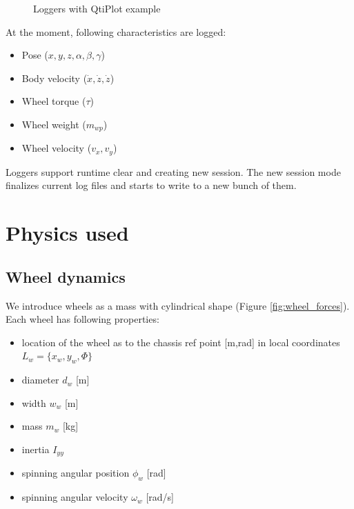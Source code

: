 \documentclass[a4paper,11pt]{article}
\begin{document}
\begin{figure}[h!]%
	\centering
	\qquad
	\caption{Loggers with QtiPlot example}%
	\label{fig:qtiplot_example1}%
\end{figure}


At the moment, following characteristics are logged:
\begin{itemize}
	\item Pose ($x, y, z, \alpha, \beta, \gamma$)
	\item Body velocity ($\dot{x}, \dot{z}, \dot{z}$)
	\item Wheel torque ($\tau$)
	\item Wheel weight ($m_{wp}$)
	\item Wheel velocity ($v_x, v_y$)
\end{itemize}

Loggers support runtime clear and creating new session. The new session mode finalizes current log files and starts to write to a new bunch of them.


\newpage

\section{Physics used}
\subsection{Wheel dynamics}

We introduce wheels as a mass with cylindrical shape (Figure \ref{fig:wheel_forces}).
Each wheel has following properties:
\begin{itemize}
\item location of the wheel as to the chassis ref point [m,rad] in local coordinates $L_w = \{ x_w, y_w, \Phi \}$
\item diameter $d_w$ [m]
\item width $w_w$ [m]
\item mass $m_w$ [kg]
\item inertia $I_{yy}$
\item spinning angular position $\phi_w$ [rad]
\item spinning angular velocity $\omega_w$ [rad/s]
\end{itemize}
\end{document}

